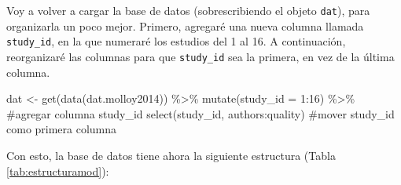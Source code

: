 \documentclass[
  bookmarksnumbered]{article}
\newenvironment{Shaded}{\begin{snugshade}}{\end{snugshade}}
\newcommand{\AttributeTok}[1]{\textcolor[rgb]{0.00,0.34,0.68}{#1}}
\newcommand{\CommentTok}[1]{\textcolor[rgb]{0.54,0.53,0.53}{#1}}
\newcommand{\DecValTok}[1]{\textcolor[rgb]{0.69,0.50,0.00}{#1}}
\newcommand{\FunctionTok}[1]{\textcolor[rgb]{0.39,0.29,0.61}{#1}}
\newcommand{\NormalTok}[1]{\textcolor[rgb]{0.12,0.11,0.11}{#1}}
\newcommand{\OtherTok}[1]{\textcolor[rgb]{0.00,0.43,0.16}{#1}}
\newcommand{\SpecialCharTok}[1]{\textcolor[rgb]{0.24,0.68,0.91}{#1}}
\begin{document}
Voy a volver a cargar la base de datos (sobrescribiendo el objeto \texttt{dat}), para organizarla un poco mejor. Primero, agregaré una nueva columna llamada \texttt{study\_id}, en la que numeraré los estudios del 1 al 16. A continuación, reorganizaré las columnas para que \texttt{study\_id} sea la primera, en vez de la última columna.

\begin{Shaded}
\begin{Highlighting}[]
\NormalTok{dat }\OtherTok{\textless{}{-}} \FunctionTok{get}\NormalTok{(}\FunctionTok{data}\NormalTok{(dat.molloy2014)) }\SpecialCharTok{\%\textgreater{}\%}
  \FunctionTok{mutate}\NormalTok{(}\AttributeTok{study\_id =} \DecValTok{1}\SpecialCharTok{:}\DecValTok{16}\NormalTok{)  }\SpecialCharTok{\%\textgreater{}\%} \CommentTok{\#agregar columna study\_id}
  \FunctionTok{select}\NormalTok{(study\_id, authors}\SpecialCharTok{:}\NormalTok{quality) }\CommentTok{\#mover study\_id como primera columna}
\end{Highlighting}
\end{Shaded}

Con esto, la base de datos tiene ahora la siguiente estructura (Tabla \ref{tab:estructuramod}):
\end{document}
